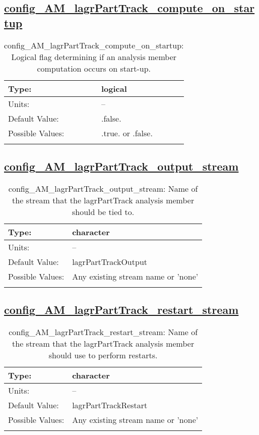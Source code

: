 \subsection[config\_AM\_lagrPartTrack\_compute\_on\_startup]{\hyperref[sec:nm_tab_AM_lagrPartTrack]{config\_AM\_lagrPartTrack\_compute\_on\_startup}}
\label{subsec:nm_sec_config_AM_lagrPartTrack_compute_on_startup}
\begin{center}
\begin{longtable}{| p{2.0in} || p{4.0in} |}
    \hline
    Type: & logical \\
    \hline
    Units: & -- \\
    \hline
    Default Value: & .false. \\
    \hline
    Possible Values: & .true. or .false. \\
    \hline
    \caption{config\_AM\_lagrPartTrack\_compute\_on\_startup: Logical flag determining if an analysis member computation occurs on start-up.}
\end{longtable}
\end{center}
\subsection[config\_AM\_lagrPartTrack\_output\_stream]{\hyperref[sec:nm_tab_AM_lagrPartTrack]{config\_AM\_lagrPartTrack\_output\_stream}}
\label{subsec:nm_sec_config_AM_lagrPartTrack_output_stream}
\begin{center}
\begin{longtable}{| p{2.0in} || p{4.0in} |}
    \hline
    Type: & character \\
    \hline
    Units: & -- \\
    \hline
    Default Value: & lagrPartTrackOutput \\
    \hline
    Possible Values: & Any existing stream name or 'none' \\
    \hline
    \caption{config\_AM\_lagrPartTrack\_output\_stream: Name of the stream that the lagrPartTrack analysis member should be tied to.}
\end{longtable}
\end{center}
\subsection[config\_AM\_lagrPartTrack\_restart\_stream]{\hyperref[sec:nm_tab_AM_lagrPartTrack]{config\_AM\_lagrPartTrack\_restart\_stream}}
\label{subsec:nm_sec_config_AM_lagrPartTrack_restart_stream}
\begin{center}
\begin{longtable}{| p{2.0in} || p{4.0in} |}
    \hline
    Type: & character \\
    \hline
    Units: & -- \\
    \hline
    Default Value: & lagrPartTrackRestart \\
    \hline
    Possible Values: & Any existing stream name or 'none' \\
    \hline
    \caption{config\_AM\_lagrPartTrack\_restart\_stream: Name of the stream that the lagrPartTrack analysis member should use to perform restarts.}
\end{longtable}
\end{center}
